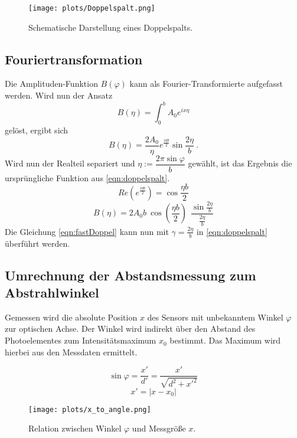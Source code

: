 \begin{figure}
  \centering
  \texttt{[image: plots/Doppelspalt.png]}
  \caption{Schematische Darstellung eines Doppelspalts.\cite{DoppelspaltWiki}}
  \label{fig:schemDoppel}
\end{figure}

\subsection{Fouriertransformation}
Die Amplituden-Funktion $B(\varphi)$ kann als Fourier-Transformierte aufgefasst werden.
Wird nun der Ansatz
\begin{equation}
  B(\eta) = \int_{0}^{b}A_0e^{ix\eta}
\end{equation}
gelöst, ergibt sich
\begin{equation}
  B(\eta) = \frac{2A_0}{\eta}e^{\frac{i\eta b}{2}}\sin{\frac{2\eta}{b}} \:.
\end{equation}
Wird nun der Realteil separiert und $\eta := \dfrac{2\pi \sin{\varphi}}{b}$ gewählt, ist das Ergebnis die ursprüngliche Funktion aus \eqref{eqn:doppelspalt}.
\begin{equation}
  Re(e^{\frac{i\eta b}{2}}) = \cos{\frac{\eta b}{2}}
\end{equation}
\begin{equation}
  B(\eta) = 2A_0b\:\cos{(\frac{\eta b}{2})}\:\:\frac{\sin{\frac{2\eta}{b}}}{\frac{2\eta}{b}}
  \label{eqn:fastDoppel}
\end{equation}
Die Gleichung \eqref{eqn:fastDoppel} kann nun mit $\gamma = \frac{2\eta}{b}$ in \eqref{eqn:doppelspalt} überführt werden.

\subsection{Umrechnung der Abstandsmessung zum Abstrahlwinkel}
Gemessen wird die absolute Position $x$ des Sensors mit unbekanntem Winkel $\varphi$ zur optischen Achse.
Der Winkel wird indirekt über den Abstand des Photoelementes zum Intensitätsmaximum $x_0$ bestimmt.
Das Maximum wird hierbei aus den Messdaten ermittelt.

\begin{equation}
  \sin{\varphi} = \frac{x'}{d'} = \frac{x'}{\sqrt{d^2+x'^2}}
\end{equation}
\begin{equation}
  x' = |x-x_0|
\end{equation}

\begin{figure}
  \centering
  \texttt{[image: plots/x\_to\_angle.png]}
  \caption{Relation zwischen Winkel $\varphi$ und Messgröße $x$.}
  \label{fig:xToAngle}
\end{figure}